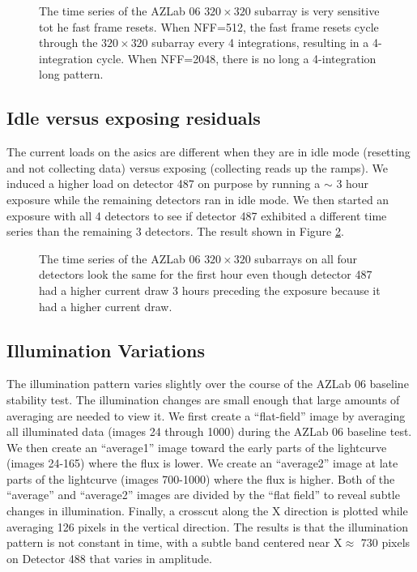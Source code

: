 \documentclass{aastex62}
\begin{document}
\begin{figure}
\caption{The time series of the AZLab 06 $320 \times 320$ subarray is very sensitive tot he fast frame resets.
When NFF=512, the fast frame resets cycle through the $320 \times 320$ subarray every 4 integrations, resulting in a 4-integration cycle.
When NFF=2048, there is no long a 4-integration long pattern.
}\label{fig:sub320NFF512vs2048}
\end{figure}

\clearpage

\subsection{Idle versus exposing residuals}
The current loads on the asics are different when they are in idle mode (resetting and not collecting data) versus exposing (collecting reads up the ramps).
We induced a higher load on detector 487 on purpose by running a $\sim$ 3 hour exposure while the remaining detectors ran in idle mode.
We then started an exposure with all 4 detectors to see if detector 487 exhibited a different time series than the remaining 3 detectors.
The result shown in Figure \ref{fig:idleVersusExposing320}.
\begin{figure}
\caption{The time series of the AZLab 06 $320 \times 320$ subarrays on all four detectors look the same for the first hour even though detector 487 had a higher current draw 3 hours preceding the exposure because it had a higher current draw.}\label{fig:idleVersusExposing320}
\end{figure}

\clearpage

\subsection{Illumination Variations}

The illumination pattern varies slightly over the course of the AZLab 06 baseline stability test.
The illumination changes are small enough that large amounts of averaging are needed to view it.
We first create a ``flat-field'' image by averaging all illuminated data (images 24 through 1000) during the AZLab 06 baseline test.
We then create an ``average1'' image toward the early parts of the lightcurve (images 24-165) where the flux is lower.
We create an ``average2'' image at late parts of the lightcurve (images 700-1000) where the flux is higher.
Both of the ``average'' and ``average2'' images are divided by the ``flat field'' to reveal subtle changes in illumination.
Finally, a crosscut along the X direction is plotted while averaging 126 pixels in the vertical direction.
The results is that the illumination pattern is not constant in time, with a subtle band centered near X$\approx$ 730 pixels on Detector 488 that varies in amplitude.
\end{document}
